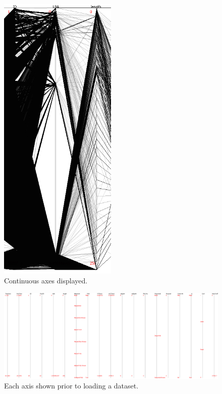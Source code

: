 \documentclass[12pt]{ucthesis}
\begin{document}
\begin{figure}[htb!]
 \centering
 \includegraphics[width=0.5\textwidth]{images/documentation/continuous.jpg}
 \caption[Continuous axes displayed.]{Continuous axes displayed.}
 \label{fig:doc}
\end{figure}

\begin{figure}[htb!]
 \centering
 \includegraphics[width=\textwidth]{images/documentation/axes.jpg}
 \caption[Each axis shown prior to loading a dataset.]{Each axis shown prior to loading a dataset.}
 \label{fig:doc}
\end{figure}
\end{document}
